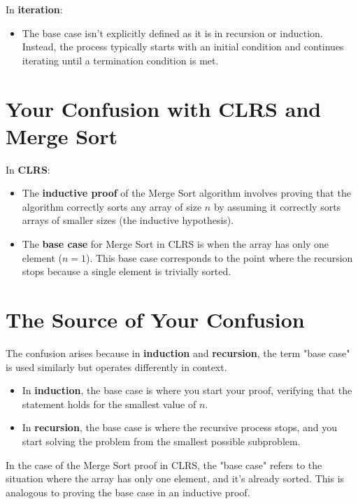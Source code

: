 \documentclass{article}
\begin{document}
In \textbf{iteration}:

\begin{itemize}
    \item The base case isn't explicitly defined as it is in recursion or induction. Instead, the process typically starts with an initial condition and continues iterating until a termination condition is met.
\end{itemize}

\section{Your Confusion with CLRS and Merge Sort}

In \textbf{CLRS}:

\begin{itemize}
    \item The \textbf{inductive proof} of the Merge Sort algorithm involves proving that the algorithm correctly sorts any array of size \( n \) by assuming it correctly sorts arrays of smaller sizes (the inductive hypothesis).
    \item The \textbf{base case} for Merge Sort in CLRS is when the array has only one element (\( n = 1 \)). This base case corresponds to the point where the recursion stops because a single element is trivially sorted.
\end{itemize}

\section{The Source of Your Confusion}

The confusion arises because in \textbf{induction} and \textbf{recursion}, the term "base case" is used similarly but operates differently in context.

\begin{itemize}
    \item In \textbf{induction}, the base case is where you start your proof, verifying that the statement holds for the smallest value of \( n \).
    \item In \textbf{recursion}, the base case is where the recursive process stops, and you start solving the problem from the smallest possible subproblem.
\end{itemize}

In the case of the Merge Sort proof in CLRS, the "base case" refers to the situation where the array has only one element, and it's already sorted. This is analogous to proving the base case in an inductive proof.
\end{document}
